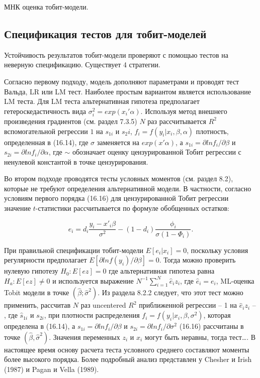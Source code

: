 МНК оценка тобит-модели.


\subsection{Спецификация тестов для тобит-моделей}


Устойчивость результатов тобит-модели проверяют с помощью тестов на неверную спецификацию. Существует 4 стратегии.

Согласно первому подходу, модель дополняют параметрами и проводят тест Вальда, LR или LM тест. Наиболее простым вариантом является использование LM теста. Для LM теста альтернативная гипотеза предполагает гетероскедастичность вида $\sigma_i^2=exp(x_i'\alpha)$. Используя метод внешнего произведения градиентов (см. раздел 7.3.5) $N$ раз рассчитывается $R^2$ вспомогательной регрессии $1$ на $s_{1i}$ и $s_2i$, $f_i=f(y_i|x_i,\beta,\alpha)$ плотность, определенная в (16.14), где $\sigma$ заменяется на $exp(x'\alpha)$, а $s_{1i}=\partial ln f_i/\partial\beta$ и $s_{2i}=\partial ln f_{i}/\partial \alpha$, где $\sim$ обозначает оценку цензурированной Тобит регрессии с ненулевой константой в точке цензурирования. 


Во втором подходе проводятся тесты условных моментов (см. раздел 8.2), которые не требуют определения альтернативной модели. В частности, согласно условиям первого порядка (16.16) для цензурированной Тобит регрессии значение $t$-статистики рассчитывается по формуле обобщенных остатков: 

\[
e_i=d_i\dfrac{y_i-x'_i\beta}{\sigma^2}-(1-d_i)\dfrac{\phi_i}{\sigma(1-\Phi_i)}.
\]

При правильной спецификации тобит-модели $E[e_i|x_i]=0$, поскольку условия регулярности предполагает $E[\partial{ln{f(y_i)}}/\partial\beta]=0$. Тогда можно проверить нулевую гипотезу $H_0:E[ez]=0$ где альтернативная гипотеза равна $H_a:E[ez]{\neq}0$ и используется выражение $N^{-1}\sum_{i=1}^N{\hat{e}_iz_i}$, где $\hat{e}_i=e_i$, ML-оценка Tobit модели в точке $(\hat{\beta};\hat{\sigma}^2)$. Из раздела 8.2.2 следует, что этот тест можно применить, рассчитав $N$ раз uncentered $R^2$ приближенной регрессии -- 1 на $\hat{e}_iz_i$ -- , где $\hat{s}_{1i}$ и $s_{2i}$, при плотности распределения $f_{i}=f(y_{i}|x_{i},\beta,\sigma^2)$, которая определена в (16.14), а $s_{1i}=\partial{ln}f_{i}/\partial\beta$ и $s_{2i}=\partial{ln}f_{i}/\partial\sigma^2$ (16.16) рассчитаны в точке $(\hat{\beta},\hat{\sigma}^2)$. Значения переменных $z_i$ и $x_i$ могут быть неравны, тогда тест\ldots . В настоящее время основу расчета теста условного среднего составляют моменты более высокого порядка. Более подробный анализ представлен у Chesher и Irish (1987) и Pagan и Vella (1989). 

